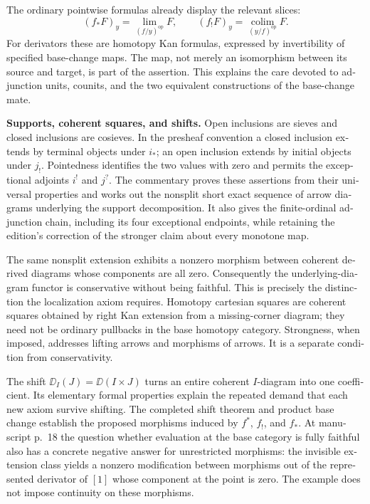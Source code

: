 \begin{otherlanguage}{english}
The ordinary pointwise formulas already display the relevant slices:
\[
 (f_*F)_y=\lim_{(f/y)^{\mathrm{op}}}F,
 \qquad
 (f_!F)_y=\operatorname*{colim}_{(y/f)^{\mathrm{op}}}F.
\]
For derivators these are homotopy Kan formulas, expressed by invertibility of specified base-change maps. The map, not merely an isomorphism between its source and target, is part of the assertion. This explains the care devoted to adjunction units, counits, and the two equivalent constructions of the base-change mate.

\medskip\noindent\textbf{Supports, coherent squares, and shifts.}
Open inclusions are sieves and closed inclusions are cosieves. In the presheaf convention a closed inclusion extends by terminal objects under $i_*$; an open inclusion extends by initial objects under $j_!$. Pointedness identifies the two values with zero and permits the exceptional adjoints $i^!$ and $j^?$. The commentary proves these assertions from their universal properties and works out the nonsplit short exact sequence of arrow diagrams underlying the support decomposition. It also gives the finite-ordinal adjunction chain, including its four exceptional endpoints, while retaining the edition's correction of the stronger claim about every monotone map.

The same nonsplit extension exhibits a nonzero morphism between coherent derived diagrams whose components are all zero. Consequently the underlying-diagram functor is conservative without being faithful. This is precisely the distinction the localization axiom requires. Homotopy cartesian squares are coherent squares obtained by right Kan extension from a missing-corner diagram; they need not be ordinary pullbacks in the base homotopy category. Strongness, when imposed, addresses lifting arrows and morphisms of arrows. It is a separate condition from conservativity.

The shift $\DD_I(J)=\DD(I\times J)$ turns an entire coherent $I$-diagram into one coefficient. Its elementary formal properties explain the repeated demand that each new axiom survive shifting. The completed shift theorem and product base change establish the proposed morphisms induced by $f^*$, $f_!$, and $f_*$. At manuscript p.~18 the question whether evaluation at the base category is fully faithful also has a concrete negative answer for unrestricted morphisms: the invisible extension class yields a nonzero modification between morphisms out of the represented derivator of $[1]$ whose component at the point is zero. The example does not impose continuity on these morphisms.


\end{otherlanguage}
